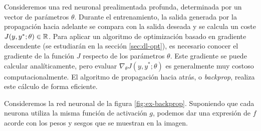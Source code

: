 Consideremos una red neuronal prealimentada profunda, determinada por un
vector de parámetros \(\theta\). Durante el entrenamiento, la salida
generada por la propagación hacia adelante se compara con la salida
deseada y se calcula un coste \(J(y,y^{*};\theta)\in\mathbb{R}\). Para aplicar
un algoritmo de optimización basado en gradiente descendente (se
estudiarán en la sección \ref{sec:dl-opt}), es necesario conocer el
gradiente de la función \(J\) respecto de los parámetros \(\theta\).
Este gradiente se puede calcular analíticamente, pero evaluar
\(\nabla_{\theta} J(y,y^{*};\theta)\) es generalmente muy costoso
computacionalmente. El algoritmo de propagación hacia atrás, o
\emph{backprop}, realiza este cálculo de forma eficiente.

\begin{example}
  
Consideremos la red neuronal de la figura \ref{fig:ex-backprop}. Suponiendo que cada neurona utiliza la misma función de activación $g$, podemos dar una expresión de $f$ acorde con los pesos y sesgos que se muestran en la imagen.


\end{example}
